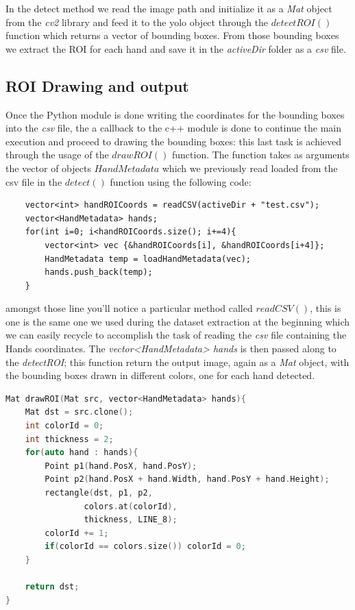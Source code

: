 In the detect method we read the image path and initialize it as a \textit{Mat} object from the \textit{cv2} library and feed it to the 
yolo object through the $detectROI()$ function which returns a vector of bounding boxes. From those bounding boxes we extract the ROI for each hand and save it in the
\textit{activeDir} folder as a \textit{csv} file.

\subsection{ROI Drawing and output}
Once the Python module is done writing the coordinates for the bounding boxes into the \textit{csv} file, 
the a callback to the c++ module is done to continue the main execution and proceed to drawing the bounding boxes:
this last task is achieved through the usage of the $drawROI()$ function. The function takes as arguments the vector of objects $HandMetadata$ which we previously
read loaded from the csv file in the $detect()$ function using the following code:

\begin{lstlisting}
    vector<int> handROICoords = readCSV(activeDir + "test.csv");
    vector<HandMetadata> hands;
    for(int i=0; i<handROICoords.size(); i+=4){
        vector<int> vec {&handROICoords[i], &handROICoords[i+4]};
        HandMetadata temp = loadHandMetadata(vec);
        hands.push_back(temp);
    }
\end{lstlisting}

amongst those line you'll notice a particular method called $readCSV()$, this is one is the same one we used during the dataset extraction at the beginning 
which we can easily recycle to accomplish the task of reading the \textit{csv} file containing the Hands coordinates. The \textit{vector<HandMetadata> hands} 
is then passed along to the \textit{detectROI}; this function return the output image, again as a \textit{Mat} object, with the bounding boxes drawn in different colors, one for each hand detected.

\begin{lstlisting}[language = c++]
    Mat drawROI(Mat src, vector<HandMetadata> hands){
    Mat dst = src.clone();
    int colorId = 0;
    int thickness = 2;
    for(auto hand : hands){
        Point p1(hand.PosX, hand.PosY);
        Point p2(hand.PosX + hand.Width, hand.PosY + hand.Height);
        rectangle(dst, p1, p2,
                colors.at(colorId),
                thickness, LINE_8);
        colorId += 1;
        if(colorId == colors.size()) colorId = 0;
    }
    
    return dst;
}

\end{lstlisting}

